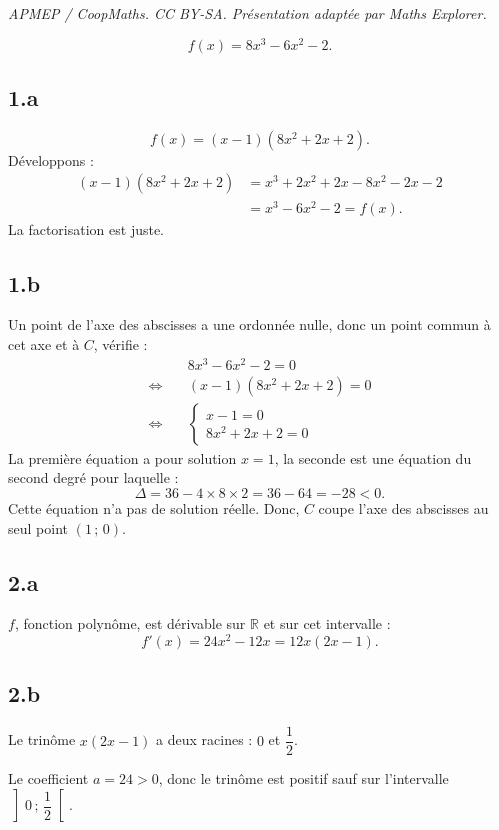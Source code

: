 \documentclass[10pt]{article}
\begin{document}
\noindent\textit{APMEP / CoopMaths. CC BY-SA. Présentation adaptée par Maths Explorer.}\par\medskip
\[
	f(x) = 8x^3 - 6x^2 - 2.
	\]
	
	\subsection*{1.a}
	\[
	f(x) = (x - 1)\left(8x^2 + 2x + 2\right).
	\]
	Développons :
	\begin{align*}
		(x - 1)\left(8x^2 + 2x + 2\right) &= x^3 + 2x^2 + 2x - 8x^2 - 2x - 2 \\
		&= x^3 - 6x^2 - 2 = f(x).
	\end{align*}
	La factorisation est juste.
	
	\subsection*{1.b}
	Un point de l'axe des abscisses a une ordonnée nulle, donc un point commun à cet axe et à \(C\), vérifie :
	\begin{align*}
		&8x^3 - 6x^2 - 2 = 0 \\
		\iff \quad & (x - 1)\left(8x^2 + 2x + 2\right) = 0 \\
		\iff \quad & 
		\begin{cases}
			x - 1 = 0 \\
			8x^2 + 2x + 2 = 0
		\end{cases}
	\end{align*}
	La première équation a pour solution \(x = 1\), la seconde est une équation du second degré pour laquelle :
	\[
	\Delta = 36 - 4 \times 8 \times 2 = 36 - 64 = -28 < 0.
	\]
	Cette équation n'a pas de solution réelle.
	Donc, \(C\) coupe l'axe des abscisses au seul point \((1\,;\,0)\).
	
	\subsection*{2.a}
	\(f\), fonction polynôme, est dérivable sur \(\mathbb{R}\) et sur cet intervalle :
	\[
	f'(x) = 24x^2 - 12x = 12x(2x - 1).
	\]
	
	\subsection*{2.b}
	Le trinôme \(x(2x - 1)\) a deux racines : \(0\) et \(\dfrac{1}{2}\).
	
	Le coefficient \(a = 24 > 0\), donc le trinôme est positif sauf sur l'intervalle \(\left]0\,;\,\dfrac{1}{2}\right[\).
	
\end{document}

